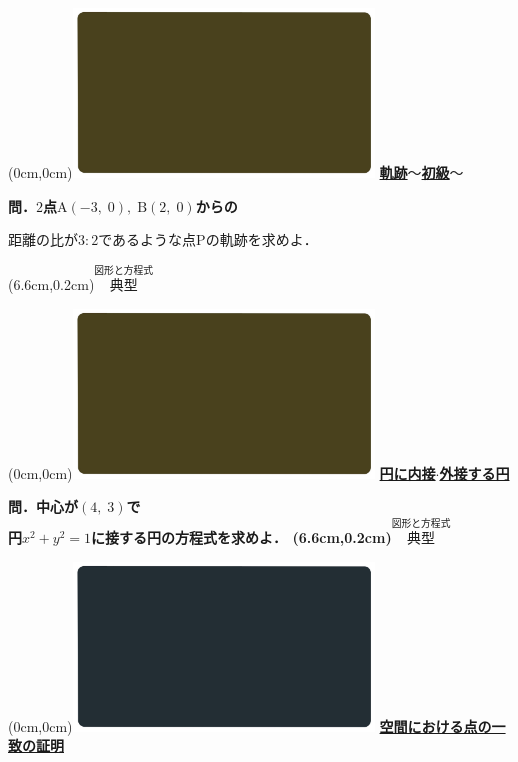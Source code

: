 \documentclass[10pt,
fleqn,
dvipdfmx,
uplatex
]{jsarticle}
\begin{document}
\at(0cm,0cm){\includegraphics[width=8cm,bb=0 0 1920 1080]{./youtube/thumbnails/templates/smart_background/図形と方程式.jpeg}}
{\color{orange}\bf\boldmath\huge\underline{軌跡$〜$初級$〜$}}\vspace{0.5zw}

\large 
\bf\boldmath 問．$2$点$\text{A}\left(-3,\;0\right),\;\text{B}\left(2,\;0\right)$からの

\LARGE 
距離の比が$3:2$であるような点$\text{P}$の軌跡を求めよ．

\at(6.6cm,0.2cm){\small\color{bradorange}$\overset{\text{図形と方程式}}{\text{典型}}$}

\newpage

\at(0cm,0cm){\includegraphics[width=8cm,bb=0 0 1920 1080]{./youtube/thumbnails/templates/smart_background/図形と方程式.jpeg}}
{\color{orange}\bf\boldmath\LARGE\underline{円に内接$\cdot$外接する円}}\vspace{0.3zw}

\huge 
\bf\boldmath 問．中心が$\left(4,\;3\right)$で\\円$x^2+y^2=1$に接する円の方程式を求めよ．
\at(6.6cm,0.2cm){\small\color{bradorange}$\overset{\text{図形と方程式}}{\text{典型}}$}

\newpage



\at(0cm,0cm){\includegraphics[width=8cm,bb=0 0 1920 1080]{./youtube/thumbnails/templates/smart_background/空間ベクトル.jpeg}}
{\color{orange}\bf\boldmath\Large\underline{空間における点の一致の証明}}\vspace{0.3zw}
\end{document}
